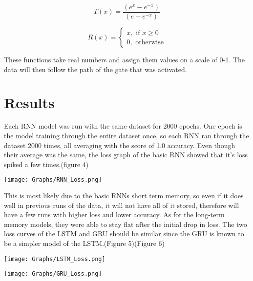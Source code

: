 \documentclass{article}
\begin{document}
\[  T(x) =  \frac{(e^x-e^{-x}) }{(e + e^{-x})} \]

\[  R(x) = \begin{cases} x,\text{ if }x \ge 0 \\ 0, \text{ otherwise}\end{cases} \] 

These functions take real numbers and assign them values on a scale of 0-1. The data will then follow the path of the gate that was activated.
 
\section{Results\centering}
\par\noindent{}
Each RNN model was run with the same dataset for 2000 epochs. One epoch is the model training through the entire dataset once, so each RNN ran through the dataset 2000 times, all averaging with the score of 1.0 accuracy. Even though their average was the same, the loss graph of the basic RNN showed that it's loss spiked a few times.(figure 4)
\begin{center}
    \begin{minipage}{0.5\linewidth}
        \texttt{[image: Graphs/RNN\_Loss.png]}
    \end{minipage}
\end{center}
\par\noindent{}This is most likely due to the basic RNNs short term memory, so even if it does well in previous runs of the data, it will not have all of it stored, therefore will have a few runs with higher loss and lower accuracy. As for the long-term memory models, they were able to stay flat after the initial drop in loss. The two loss curves of the LSTM and GRU should be similar since the GRU is known to be a simpler model of the LSTM.(Figure 5)(Figure 6)
\par\noindent{}
\begin{center}
    \begin{minipage}{0.48\linewidth}
        \texttt{[image: Graphs/LSTM\_Loss.png]}
    \end{minipage}
    \begin{minipage}{0.48\linewidth}
     \texttt{[image: Graphs/GRU\_Loss.png]}    
    \end{minipage}
\end{center}
\end{document}
